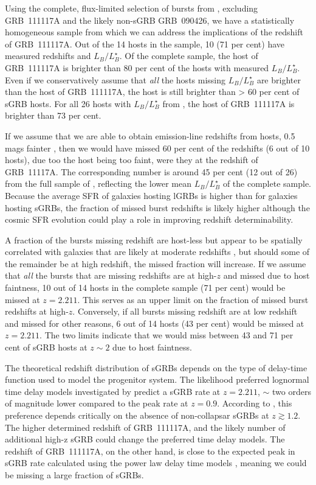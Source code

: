 \documentclass{aa}    %
\begin{document}
Using the complete, flux-limited selection of bursts from \citet{DAvanzo2014a},
excluding GRB~111117A and the likely non-sGRB GRB~090426, we have a
statistically homogeneous sample from which we can address the implications of
the redshift of GRB~111117A. Out of the 14 hosts in the sample, 10 (71 per cent)
have measured redshifts and $L_B/L^{\star}_{B}$. Of the complete sample, the
host of GRB~111117A  is brighter than 80 per cent of the hosts with measured
$L_B/L^{\star}_{B}$. Even if we conservatively assume that \textit{all} the
hosts missing $L_B/L^{\star}_{B}$ are brighter than the host of GRB~111117A, the
host is still brighter than > 60 per cent of sGRB hosts. For all 26 hosts with
$L_B/L^{\star}_{B}$ from \citet{Berger2014}, the host of GRB~111117A is brighter
than 73 per cent.

If we assume that we are able to obtain emission-line redshifts from hosts, 0.5
mags fainter \citep[$R < 24.5$~mag;][]{Kruhler2012}, then we would have missed
60 per cent of the redshifts (6 out of 10 hosts), due too the host being too
faint, were they at the redshift of GRB~11117A. The corresponding number is
around 45 per cent (12 out of 26) from the full sample of \citet{Berger2014},
reflecting the lower mean $L_B/L^{\star}_{B}$ of the complete sample. Because
the average SFR of galaxies hosting lGRBs is higher than for galaxies hosting
sGRBs, the fraction of missed burst redshifts is likely higher although the
cosmic SFR evolution could play a role in improving redshift determinability.

A fraction of the bursts missing redshift are host-less but appear to be
spatially correlated with galaxies that are likely at moderate redshifts
\citep{Tunnicliffe2014}, but should some of the remainder be at high redshift,
the missed fraction will increase. If we assume that \textit{all} the bursts
that are missing redshifts are at high-$z$ and missed due to host faintness, 10
out of 14 hosts in the complete sample (71 per cent) would be missed at $z =
2.211$. This serves as an upper limit on the fraction of missed burst redshifts
at high-$z$. Conversely, if all bursts missing redshift are at low redshift and
missed for other reasons, 6 out of 14 hosts (43 per cent) would be missed at $z
= 2.211$. The two limits indicate that we would miss between 43 and 71 per cent
of sGRB hosts at $z \sim 2$ due to host faintness.

The theoretical redshift distribution of sGRBs depends on the type of delay-time
function used to model the progenitor system. The likelihood preferred lognormal
time delay models investigated by \citet{Wanderman2015} predict a sGRB rate at
$z = 2.211$, $\sim$ two orders of magnitude lower compared to the peak rate at
$z = 0.9$. According to \citet{Wanderman2015}, this preference depends
critically on the absence of non-collapsar sGRBs at $z \gtrsim 1.2$. The higher
determined redshift of GRB~111117A, and the likely number of additional high-z
sGRB could change the preferred time delay models. The redshift of GRB~111117A,
on the other hand, is close to the expected peak in sGRB rate calculated using
the power law delay time models \citep{Behroozi2014, Wanderman2015,
	Ghirlanda2016}, meaning we could be missing a large fraction of sGRBs.
\end{document}
